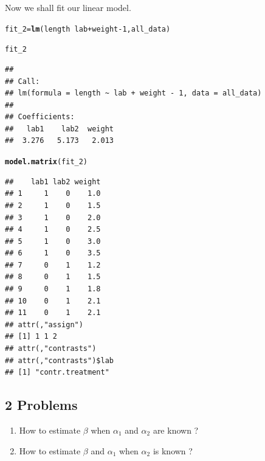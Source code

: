 \documentclass[11pt, a4paper]{article}\usepackage[]{graphicx}\usepackage[]{xcolor}
\makeatletter
\newcommand{\hlnum}[1]{\textcolor[rgb]{0.686,0.059,0.569}{#1}}%
\newcommand{\hlopt}[1]{\textcolor[rgb]{0,0,0}{#1}}%
\newcommand{\hldef}[1]{\textcolor[rgb]{0.345,0.345,0.345}{#1}}%
\newcommand{\hlkwb}[1]{\textcolor[rgb]{0.69,0.353,0.396}{#1}}%
\newcommand{\hlkwd}[1]{\textcolor[rgb]{0.737,0.353,0.396}{\textbf{#1}}}%
\newenvironment{kframe}{%
 \def\at@end@of@kframe{}%
 \ifinner\ifhmode%
  \def\at@end@of@kframe{\end{minipage}}%
  \begin{minipage}{\columnwidth}%
 \fi\fi%
 \def\FrameCommand##1{\hskip\@totalleftmargin \hskip-\fboxsep
 \colorbox{shadecolor}{##1}\hskip-\fboxsep
     \hskip-\linewidth \hskip-\@totalleftmargin \hskip\columnwidth}%
 \MakeFramed {\advance\hsize-\width
   \@totalleftmargin\z@ \linewidth\hsize
   \@setminipage}}%
 {\par\unskip\endMakeFramed%
 \at@end@of@kframe}
\newenvironment{knitrout}{}{} %
\makeatother
\begin{document}
Now we shall fit our linear model.

\begin{knitrout}
\color{fgcolor}\begin{kframe}
\begin{alltt}
\hldef{fit_2} \hlkwb{=} \hlkwd{lm}\hldef{(length} \hlopt{~} \hldef{lab} \hlopt{+} \hldef{weight} \hlopt{-} \hlnum{1}\hldef{, all_data)}
\end{alltt}
\end{kframe}
\end{knitrout}

\begin{knitrout}
\color{fgcolor}\begin{kframe}
\begin{alltt}
\hldef{fit_2}
\end{alltt}
\begin{verbatim}
## 
## Call:
## lm(formula = length ~ lab + weight - 1, data = all_data)
## 
## Coefficients:
##   lab1    lab2  weight  
##  3.276   5.173   2.013
\end{verbatim}
\end{kframe}
\end{knitrout}

\begin{knitrout}
\color{fgcolor}\begin{kframe}
\begin{alltt}
\hlkwd{model.matrix}\hldef{(fit_2)}
\end{alltt}
\begin{verbatim}
##    lab1 lab2 weight
## 1     1    0    1.0
## 2     1    0    1.5
## 3     1    0    2.0
## 4     1    0    2.5
## 5     1    0    3.0
## 6     1    0    3.5
## 7     0    1    1.2
## 8     0    1    1.5
## 9     0    1    1.8
## 10    0    1    2.1
## 11    0    1    2.1
## attr(,"assign")
## [1] 1 1 2
## attr(,"contrasts")
## attr(,"contrasts")$lab
## [1] "contr.treatment"
\end{verbatim}
\end{kframe}
\end{knitrout}

\subsection*{2 Problems}

\begin{enumerate}

\item How to estimate $\beta$ when $\alpha_1$ and $\alpha_2$ are known ?
\item How to estimate $\beta$ and $\alpha_1$ when $\alpha_2$ is known ?

\end{enumerate}
\end{document}

